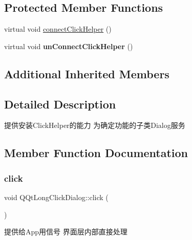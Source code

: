 \subsection*{Protected Member Functions}
\begin{DoxyCompactItemize}
\item 
virtual void \mbox{\hyperlink{class_q_qt_long_click_dialog_a7ecc2043f891de0ed8ce71d99f5860ac}{connect\+Click\+Helper}} ()
\item 
\mbox{\label{class_q_qt_long_click_dialog_abf1161417ea15c21b5d58fe19c5361ca}} 
virtual void {\bfseries un\+Connect\+Click\+Helper} ()
\end{DoxyCompactItemize}
\subsection*{Additional Inherited Members}


\subsection{Detailed Description}
提供安装\+Click\+Helper的能力 为确定功能的子类\+Dialog服务 

\subsection{Member Function Documentation}
\mbox{\label{class_q_qt_long_click_dialog_a470d4f0c26b44aeda6723469c610585a}} 
\subsubsection{\texorpdfstring{click}{click}}
{\footnotesize\ttfamily void Q\+Qt\+Long\+Click\+Dialog\+::click (\begin{DoxyParamCaption}{ }\end{DoxyParamCaption})\hspace{0.3cm}{\ttfamily [signal]}}

提供给\+App用信号 界面层内部直接处理 \mbox{\label{class_q_qt_long_click_dialog_a7ecc2043f891de0ed8ce71d99f5860ac}} 
